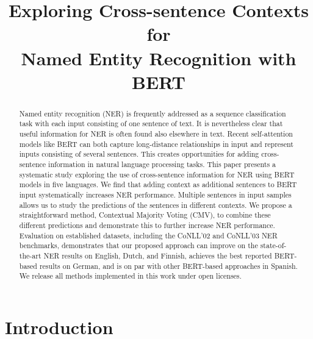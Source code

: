 \title{Exploring Cross-sentence Contexts for\\Named Entity Recognition with BERT}



\maketitle
\begin{abstract}
Named entity recognition (NER) is frequently addressed as a sequence classification task with each input consisting of one sentence of text. It is nevertheless clear that useful information for NER is often found also elsewhere in text. Recent self-attention models like BERT can both capture long-distance relationships in input and represent inputs consisting of several sentences. This creates opportunities for adding cross-sentence information in natural language processing tasks. This paper presents a systematic study exploring the use of cross-sentence information for NER using BERT models in five languages. We find that adding context as additional sentences to BERT input systematically increases NER performance. Multiple sentences in input samples allows us to study the predictions of the sentences in different contexts. We propose a straightforward method, Contextual Majority Voting (CMV), to combine these different predictions and demonstrate this to further increase NER performance. Evaluation on established datasets, including the CoNLL'02 and CoNLL'03 NER benchmarks, demonstrates that our proposed approach can improve on the state-of-the-art NER results on English, Dutch, and Finnish, achieves the best reported BERT-based results on German, and is on par with other BERT-based approaches in Spanish. We release all methods implemented in this work under open licenses.

\end{abstract}

\section{Introduction}
\label{intro}

